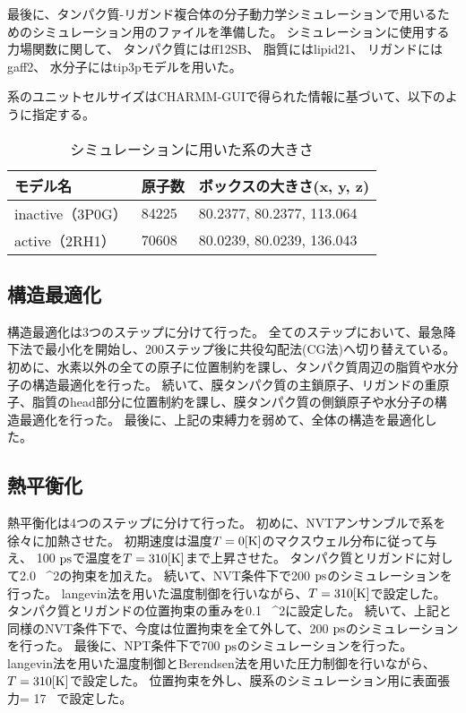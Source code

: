 最後に、タンパク質-リガンド複合体の分子動力学シミュレーションで用いるためのシミュレーション用のファイルを準備した。
シミュレーションに使用する力場関数に関して、
タンパク質にはff12SB、
脂質にはlipid21、
リガンドにはgaff2、
水分子にはtip3pモデルを用いた。

系のユニットセルサイズはCHARMM-GUIで得られた情報に基づいて、以下のように指定する。
\begin{table}[!ht]
    \centering
    \caption{シミュレーションに用いた系の大きさ}
    \begin{tabular}{lll}
      \hline
      モデル名          & 原子数  & ボックスの大きさ(x, y, z) \\
      \hline 
      inactive（3P0G）  & 84225 & 80.2377, 80.2377, 113.064 \\ 
      active（2RH1）    & 70608 & 80.0239, 80.0239, 136.043 \\ 
    \end{tabular}
    \label{tab:system_size}
  \end{table}



\subsection{構造最適化}
構造最適化は3つのステップに分けて行った。
全てのステップにおいて、最急降下法で最小化を開始し、200ステップ後に共役勾配法(CG法)へ切り替えている。
初めに、水素以外の全ての原子に位置制約を課し、タンパク質周辺の脂質や水分子の構造最適化を行った。
続いて、膜タンパク質の主鎖原子、リガンドの重原子、脂質のhead部分に位置制約を課し、膜タンパク質の側鎖原子や水分子の構造最適化を行った。
最後に、上記の束縛力を弱めて、全体の構造を最適化した。

\subsection{熱平衡化}
熱平衡化は4つのステップに分けて行った。
初めに、NVTアンサンブルで系を徐々に加熱させた。
初期速度は温度$T = 0 \rm{[K]}$のマクスウェル分布に従って与え、 100 $\rm{ps}$で温度を$T = 310 \rm{[K]}$まで上昇させた。
タンパク質とリガンドに対して2.0 \, ^2の拘束を加えた。
続いて、NVT条件下で200 $\rm{ps}$のシミュレーションを行った。
langevin法を用いた温度制御を行いながら、$T = 310 \rm{[K]}$で設定した。
タンパク質とリガンドの位置拘束の重みを0.1 \, ^2に設定した。
続いて、上記と同様のNVT条件下で、今度は位置拘束を全て外して、200 $\rm{ps}$のシミュレーションを行った。
最後に、NP\gamma T条件下で700 $\rm{ps}$のシミュレーションを行った。
langevin法を用いた温度制御とBerendsen法を用いた圧力制御を行いながら、$T = 310 \rm{[K]}$で設定した。
位置拘束を外し、膜系のシミュレーション用に表面張力\gamma = 17 \, で設定した。

